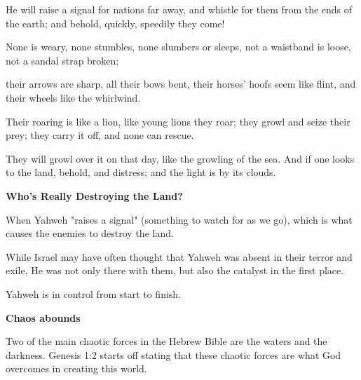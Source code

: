 \documentclass[11pt]{article}
\begin{document}
\begin{biblicaloutline}[Isaiah 5:26-30 (A')]

    \begin{versesection}{2em}
         He will raise a signal for nations far away,
        \poetryline and whistle for them from the ends of the earth;
        \poetryline and behold, quickly, speedily they come!
        
         None is weary, none stumbles,
        \poetryline none slumbers or sleeps,
        not a waistband is loose,
        \poetryline not a sandal strap broken;
        
         their arrows are sharp,
        \poetryline all their bows bent,
        their horses' hoofs seem like flint,
        \poetryline and their wheels like the whirlwind.
        
         Their roaring is like a lion,
        \poetryline like young lions they roar;
        they growl and seize their prey;
        \poetryline they carry it off, and none can rescue.
        
         They will growl over it on that day,
        \poetryline like the growling of the sea.
        And if one looks to the land,
        \poetryline behold,  and distress;
        and the light is  by its clouds.
    \end{versesection}

\end{biblicaloutline}


\newpage
{\large\bfseries Who's Really Destroying the Land?}
\vspace{1em}

When Yahweh "raises a signal" (something to watch for as we go), which is what causes the enemies to destroy the land.

While Israel may have often thought that Yahweh was absent in their terror and exile, He was not only there with them, but also the catalyst in the first place.

{\vspace{1em}}
Yahweh is in control from start to finish.

\vspace{3em}
{\large\bfseries Chaos abounds}
\vspace{1em}

Two of the main chaotic forces in the Hebrew Bible are the waters and the darkness. Genesis 1:2 starts off stating that these chaotic forces are what God overcomes in creating this world.
\end{document}
